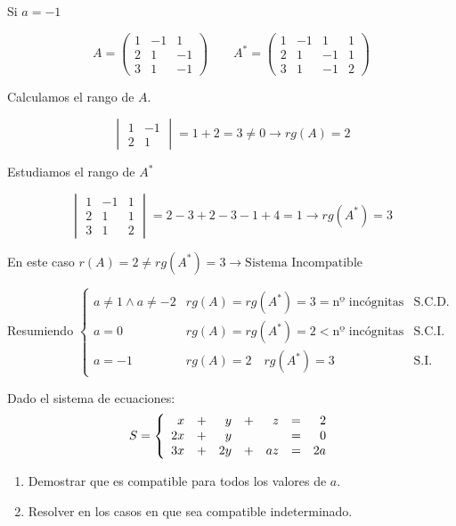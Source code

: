 \documentclass[9pt]{beamer}
\newenvironment{sistematres}{\left\lbrace \begin{array}{rrrrrrr}}{\end{array} \right.}
\begin{document}
\begin{frame} 

Si $a=-1$ 

\[ A=\begin{pmatrix}
	1 & -1 & 1 \\
	2 & 1 & -1 \\
	3 & 1 & -1
\end{pmatrix}
\qquad
A^*=\begin{pmatrix}
	1 & -1 & 1 & 1 \\
	2 & 1 & -1 & 1 \\
	3 & 1 & -1 & 2
\end{pmatrix} 
\]

\pause
Calculamos el rango de $A$.

\[ \begin{vmatrix}
	 1 & -1 \\
 	2 & 1
\end{vmatrix}= 1+2=3 \neq 0 \rightarrow rg(A)=2\]

\pause
Estudiamos el rango de $A^*$

\[ \begin{vmatrix}
	1 & -1 & 1 \\
	2 & 1 & 1 \\
	3 & 1 & 2
\end{vmatrix}= 2-3+2-3-1+4=1 \rightarrow rg(A^*)=3
\]

En este caso $r(A)=2 \neq rg(A^*)=3 \rightarrow \text{Sistema Incompatible}$

\pause

Resumiendo 
$\left\lbrace 
\begin{array}{lll} 
a\neq 1 \wedge a \neq -2 & rg(A)=rg(A^*)=3=\text{nº incógnitas} & \text{S.C.D.} \\
a=0 & rg(A)=rg(A^*)=2 <\text{nº incógnitas} & \text{S.C.I.} \\
a=-1 & rg(A)=2 \quad rg(A^*)=3 & \text{S.I.}
\end{array}
\right.$
\end{frame}

\begin{frame}
\begin{exampleblock}
Dado el sistema de ecuaciones:
\[
S=\begin{sistematres}
	x & + & y & + & z & = & 2 \\
	2x & + & y & & & = & 0 \\
	3x & + & 2y & + & az & = &2a 
\end{sistematres}
\]

\begin{enumerate}
\item Demostrar que es compatible para todos los valores de $a$.
\item Resolver en los casos en que sea compatible indeterminado.
\end{enumerate}
\end{exampleblock}

\end{frame}
\end{document}
